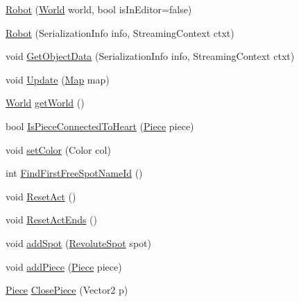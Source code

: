\begin{DoxyCompactItemize}
\item 
\hyperlink{classgearit_1_1src_1_1robot_1_1_robot_a7ac841c500d5ed51a26f3f9b401a9af2}{Robot} (\hyperlink{class_farseer_physics_1_1_dynamics_1_1_world}{World} world, bool is\+In\+Editor=false)
\item 
\hyperlink{classgearit_1_1src_1_1robot_1_1_robot_a7e4a423fc72103f28c3ca9cc3539ddde}{Robot} (Serialization\+Info info, Streaming\+Context ctxt)
\item 
void \hyperlink{classgearit_1_1src_1_1robot_1_1_robot_ac3300f022e8744f7355fa8b6871ac062}{Get\+Object\+Data} (Serialization\+Info info, Streaming\+Context ctxt)
\item 
void \hyperlink{classgearit_1_1src_1_1robot_1_1_robot_ad5de51386732d800c61deccabcc89347}{Update} (\hyperlink{classgearit_1_1src_1_1map_1_1_map}{Map} map)
\item 
\hyperlink{class_farseer_physics_1_1_dynamics_1_1_world}{World} \hyperlink{classgearit_1_1src_1_1robot_1_1_robot_a4ea8eaa66196979faebb1a48a076344a}{get\+World} ()
\item 
bool \hyperlink{classgearit_1_1src_1_1robot_1_1_robot_a27dbdffbcf378ab3a2c2fd6d57dd0c6f}{Is\+Piece\+Connected\+To\+Heart} (\hyperlink{classgearit_1_1src_1_1robot_1_1_piece}{Piece} piece)
\item 
void \hyperlink{classgearit_1_1src_1_1robot_1_1_robot_a855521f4c7b3e9b0110edb3537cefe60}{set\+Color} (Color col)
\item 
int \hyperlink{classgearit_1_1src_1_1robot_1_1_robot_a0315628bee2f0f165dee7b15b953a9a6}{Find\+First\+Free\+Spot\+Name\+Id} ()
\item 
void \hyperlink{classgearit_1_1src_1_1robot_1_1_robot_a3ecb7905e465c75103a8edac57c0d4d7}{Reset\+Act} ()
\item 
void \hyperlink{classgearit_1_1src_1_1robot_1_1_robot_afd1c0225d88394c44aa341051924d771}{Reset\+Act\+Ends} ()
\item 
void \hyperlink{classgearit_1_1src_1_1robot_1_1_robot_aca31f79167658df4e1c00201e652d13e}{add\+Spot} (\hyperlink{classgearit_1_1src_1_1robot_1_1_revolute_spot}{Revolute\+Spot} spot)
\item 
void \hyperlink{classgearit_1_1src_1_1robot_1_1_robot_a02cb3e784efbed703e41c842ae65c9a9}{add\+Piece} (\hyperlink{classgearit_1_1src_1_1robot_1_1_piece}{Piece} piece)
\item 
\hyperlink{classgearit_1_1src_1_1robot_1_1_piece}{Piece} \hyperlink{classgearit_1_1src_1_1robot_1_1_robot_adb7009fa5776025621e69d85df63dfa7}{Close\+Piece} (Vector2 p)

\end{DoxyCompactItemize}
